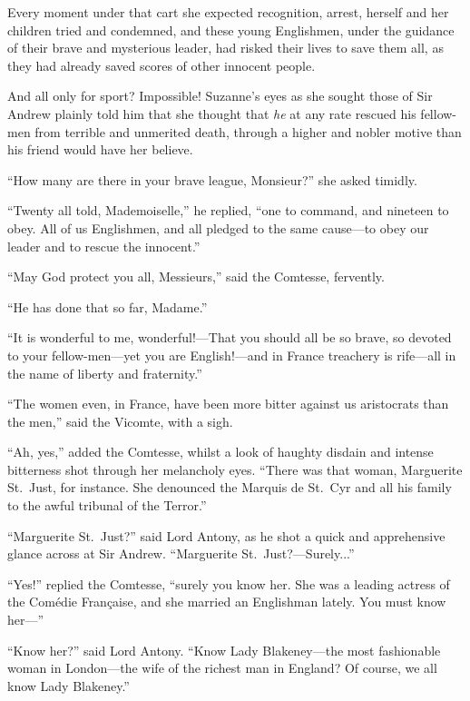 \documentclass[paper=5.5in:8.5in,BCOR=7mm,twoside,DIV=calc,12pt,usegeometry,chapterprefix,endperiod,headings=big]{scrbook}
\begin{document}
Every moment under that cart she expected recognition, arrest, herself and her children tried and condemned, and these young Englishmen, under the guidance of their brave and mysterious leader, had risked their lives to save them all, as they had already saved scores of other innocent people.

And all only for sport? Impossible! Suzanne's eyes as she sought those of Sir Andrew plainly told him that she thought that \textit{he} at any rate rescued his fellow-men from terrible and unmerited death, through a higher and nobler motive than his friend would have her believe.

\enquote{How many are there in your brave league, Monsieur?} she asked timidly.

\enquote{Twenty all told, Mademoiselle,} he replied, \enquote{one to command, and nineteen to obey. All of us Englishmen, and all pledged to the same cause---to obey our leader and to rescue the innocent.}

\enquote{May God protect you all, Messieurs,} said the Comtesse, fervently.

\enquote{He has done that so far, Madame.}

\enquote{It is wonderful to me, wonderful!---That you should all be so brave, so devoted to your fellow-men---yet you are English!---and in France treachery is rife---all in the name of liberty and fraternity.}

\enquote{The women even, in France, have been more bitter against us aristocrats than the men,} said the Vicomte, with a sigh.

\enquote{Ah, yes,} added the Comtesse, whilst a look of haughty disdain and intense bitterness shot through her melancholy eyes. \enquote{There was that woman, Marguerite St.~Just, for instance. She denounced the Marquis de St.~Cyr and all his family to the awful tribunal of the Terror.}

\enquote{Marguerite St.~Just?} said Lord Antony, as he shot a quick and apprehensive glance across at Sir Andrew. \enquote{Marguerite St.~Just?---Surely...}

\enquote{Yes!} replied the Comtesse, \enquote{surely you know her. She was a leading actress of the Comédie Française, and she married an Englishman lately. You must know her---}

\enquote{Know her?} said Lord Antony. \enquote{Know Lady Blakeney---the most fashionable woman in London---the wife of the richest man in England? Of course, we all know Lady Blakeney.}
\end{document}
